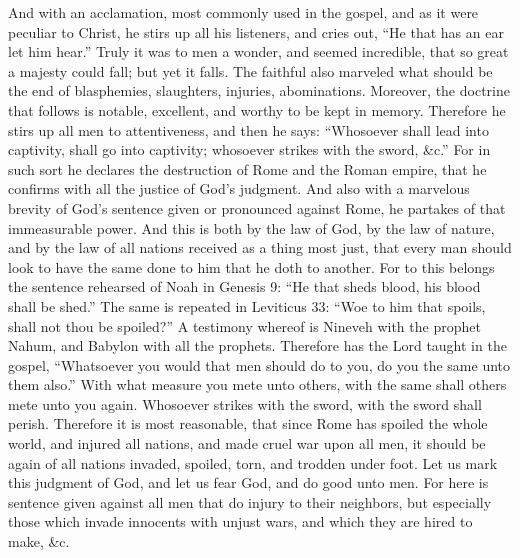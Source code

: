 And with an acclamation, most commonly used in the gospel, and as it were peculiar to Christ, he stirs up all his listeners, and cries out, “He that has an ear let him hear.” Truly it was to men a wonder, and seemed incredible, that so great a majesty could fall; but yet it falls. The faithful also marveled what should be the end of blasphemies, slaughters, injuries, abominations. Moreover, the doctrine that follows is notable, excellent, and worthy to be kept in memory. Therefore he stirs up all men to attentiveness, and then he says: “Whosoever shall lead into captivity, shall go into captivity; whosoever strikes with the sword, \&c.” For in such sort he declares the destruction of Rome and the Roman empire, that he confirms with all the justice of God’s judgment. And also with a marvelous brevity of God’s sentence given or pronounced against Rome, he partakes of that immeasurable power. And this is both by the law of God, by the law of nature, and by the law of all nations received as a thing most just, that every man should look to have the same done to him that he doth to another. For to this belongs the sentence rehearsed of Noah in Genesis 9: “He that sheds blood, his blood shall be shed.” The same is repeated in Leviticus 33: “Woe to him that spoils, shall not thou be spoiled?” A testimony whereof is Nineveh with the prophet Nahum, and Babylon with all the prophets. Therefore has the Lord taught in the gospel, “Whatsoever you would that men should do to you, do you the same unto them also.” With what measure you mete unto others, with the same shall others mete unto you again. Whosoever strikes with the sword, with the sword shall perish. Therefore it is most reasonable, that since Rome has spoiled the whole world, and injured all nations, and made cruel war upon all men, it should be again of all nations invaded, spoiled, torn, and trodden under foot. Let us mark this judgment of God, and let us fear God, and do good unto men. For here is sentence given against all men that do injury to their neighbors, but especially those which invade innocents with unjust wars, and which they are hired to make, \&c.


